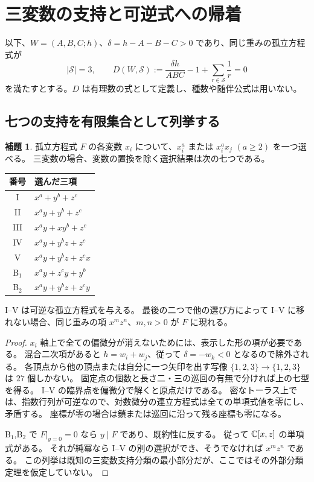 \documentclass[11pt,a4paper]{ltjsarticle}
\numberwithin{equation}{section}
\theoremstyle{definition}
\newtheorem{lemma}[theorem]{補題}
\begin{document}
\section{三変数の支持と可逆式への帰着}\label{sec:support}
以下、$W=(A,B,C;h)$、$\delta=h-A-B-C>0$ であり、同じ重みの孤立方程式が
\begin{equation}\label{eq:threecondition}
 |\mathcal S|=3,\qquad
 D(W,\mathcal S):=\frac{\delta h}{ABC}-1+\sum_{r\in\mathcal S}\frac1r=0
\end{equation}
を満たすとする。$D$ は有理数の式として定義し、種数や随伴公式は用いない。

\subsection{七つの支持を有限集合として列挙する}
\begin{lemma}\label{lem:seven}
孤立方程式 $F$ の各変数 $x_i$ について、$x_i^a$ または $x_i^a x_j$ $(a\ge2)$ を一つ選べる。
三変数の場合、変数の置換を除く選択結果は次の七つである。
\begin{center}
\begin{tabular}{cl}
\toprule
番号 & 選んだ三項\\\midrule
I & $x^a+y^b+z^c$\\
II & $x^ay+y^b+z^c$\\
III & $x^ay+xy^b+z^c$\\
IV & $x^ay+y^bz+z^c$\\
V & $x^ay+y^bz+z^cx$\\
B$_1$ & $x^ay+z^cy+y^b$\\
B$_2$ & $x^ay+y^bz+z^cy$\\\bottomrule
\end{tabular}
\end{center}
I--V は可逆な孤立方程式を与える。
最後の二つで他の選び方によって I--V に移れない場合、同じ重みの項 $x^m z^n$、$m,n>0$ が $F$ に現れる。
\end{lemma}
\begin{proof}
$x_i$ 軸上で全ての偏微分が消えないためには、表示した形の項が必要である。
混合二次項があると $h=w_i+w_j$、従って $\delta=-w_k<0$ となるので除外される。
各頂点から他の頂点または自分に一つ矢印を出す写像 $\{1,2,3\}\to\{1,2,3\}$ は $27$ 個しかない。
固定点の個数と長さ二・三の巡回の有無で分ければ上の七型を得る。
I--V の臨界点を偏微分で解くと原点だけである。
密なトーラス上では、指数行列が可逆なので、対数微分の連立方程式は全ての単項式値を零にし、矛盾する。
座標が零の場合は鎖または巡回に沿って残る座標も零になる。

B$_1$,B$_2$ で $F|_{y=0}=0$ なら $y\mid F$ であり、既約性に反する。
従って $\mathbb C[x,z]$ の単項式がある。
それが純冪なら I--V の別の選択ができ、そうでなければ $x^m z^n$ である。
この列挙は既知の三変数支持分類\cite{Rarovskii}の最小部分だが、ここではその外部分類定理を仮定していない。
\end{proof}
\end{document}
